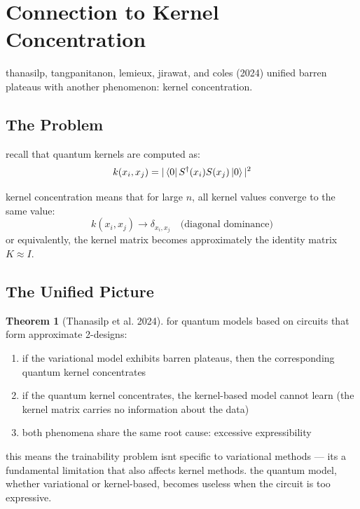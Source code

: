 \documentclass[11pt,a4paper]{article}
\theoremstyle{definition}
\newtheorem{theorem}{Theorem}[section]
\theoremstyle{remark}
\begin{document}
\section{Connection to Kernel Concentration}

thanasilp, tangpanitanon, lemieux, jirawat, and coles (2024) unified barren plateaus with another phenomenon: kernel concentration.

\subsection{The Problem}

recall that quantum kernels are computed as:
\begin{equation}
    k(x_i, x_j) = |\bra{0} S^\dagger(x_i) S(x_j) \ket{0}|^2
\end{equation}

kernel concentration means that for large $n$, all kernel values converge to the same value:
\begin{equation}
    k(x_i, x_j) \to \delta_{x_i, x_j} \quad \text{(diagonal dominance)}
\end{equation}
or equivalently, the kernel matrix becomes approximately the identity matrix $K \approx I$.

\subsection{The Unified Picture}

\begin{theorem}[Thanasilp et al. 2024]
for quantum models based on circuits that form approximate 2-designs:
\begin{enumerate}[label=(\roman*)]
    \item if the variational model exhibits barren plateaus, then the corresponding quantum kernel concentrates
    \item if the quantum kernel concentrates, the kernel-based model cannot learn (the kernel matrix carries no information about the data)
    \item both phenomena share the same root cause: excessive expressibility
\end{enumerate}
\end{theorem}

this means the trainability problem isnt specific to variational methods --- its a fundamental limitation that also affects kernel methods. the quantum model, whether variational or kernel-based, becomes useless when the circuit is too expressive.
\end{document}
